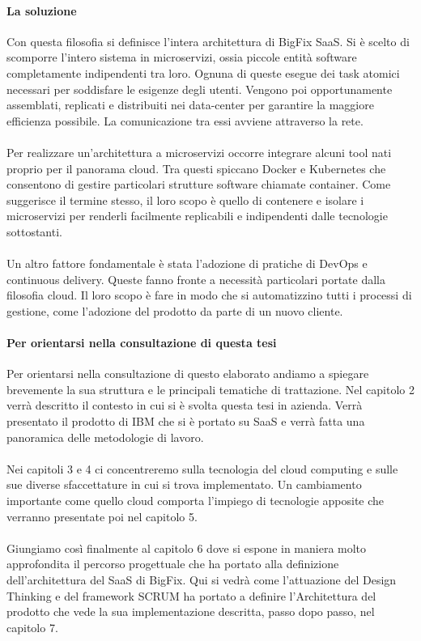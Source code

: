 \paragraph{La soluzione}
Con questa filosofia si definisce l'intera architettura di BigFix SaaS. Si è scelto di scomporre l'intero sistema in microservizi, ossia piccole entità software completamente indipendenti tra loro. Ognuna di queste esegue dei task atomici necessari per soddisfare le esigenze degli utenti. Vengono poi opportunamente assemblati, replicati e distribuiti nei data-center per garantire la maggiore efficienza possibile. La comunicazione tra essi avviene attraverso la rete.
\paragraph{}
Per realizzare un'architettura a microservizi occorre integrare alcuni tool nati proprio per il panorama cloud. Tra questi spiccano Docker e Kubernetes che consentono di gestire particolari strutture software chiamate container. Come suggerisce il termine stesso, il loro scopo è quello di contenere e isolare i microservizi per renderli facilmente replicabili e indipendenti dalle tecnologie sottostanti.
\paragraph{}
Un altro fattore fondamentale è stata l'adozione di pratiche di DevOps e continuous delivery. Queste fanno fronte a necessità particolari portate dalla filosofia cloud. Il loro scopo è fare in modo che si automatizzino tutti i processi di gestione, come l'adozione del prodotto da parte di un nuovo cliente.

\paragraph{Per orientarsi nella consultazione di questa tesi}
Per orientarsi nella consultazione di questo elaborato andiamo a spiegare brevemente la sua struttura e le principali tematiche di trattazione. Nel capitolo 2 verrà descritto il contesto in cui si è svolta questa tesi in azienda. Verrà presentato il prodotto di IBM che si è portato su SaaS e verrà fatta una panoramica delle metodologie di lavoro.
\paragraph{}
Nei capitoli 3 e 4 ci concentreremo sulla tecnologia del cloud computing e sulle sue diverse sfaccettature in cui si trova implementato. Un cambiamento importante come quello cloud comporta l'impiego di tecnologie apposite che verranno presentate poi nel capitolo 5.
\paragraph{}
Giungiamo così finalmente al capitolo 6 dove si espone in maniera molto approfondita il percorso progettuale che ha portato alla definizione dell'architettura del SaaS di BigFix. Qui si vedrà come l'attuazione del Design Thinking e del framework SCRUM ha portato a definire l'Architettura del prodotto che vede la sua implementazione descritta, passo dopo passo, nel capitolo 7.